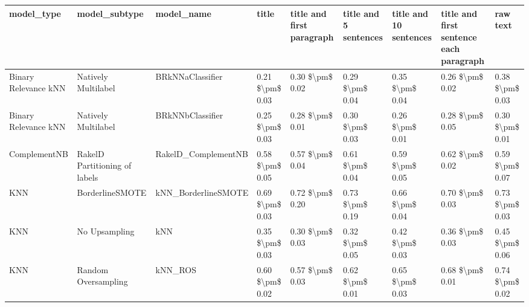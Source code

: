\begin{tabular}{lllllllll}
\toprule
                     model\_type &                 model\_subtype &                                   model\_name &           title & title and first paragraph & title and 5 sentences & title and 10 sentences & title and first sentence each paragraph &        raw text \\
\midrule
           Binary Relevance kNN &           Natively Multilabel &                             BRkNNaClassifier & 0.21 \$\textbackslash pm\$ 0.03 &           0.30 \$\textbackslash pm\$ 0.02 &       0.29 \$\textbackslash pm\$ 0.04 &        0.35 \$\textbackslash pm\$ 0.04 &                         0.26 \$\textbackslash pm\$ 0.02 & 0.38 \$\textbackslash pm\$ 0.03 \\
           Binary Relevance kNN &           Natively Multilabel &                             BRkNNbClassifier & 0.25 \$\textbackslash pm\$ 0.03 &           0.28 \$\textbackslash pm\$ 0.01 &       0.30 \$\textbackslash pm\$ 0.03 &        0.26 \$\textbackslash pm\$ 0.01 &                         0.28 \$\textbackslash pm\$ 0.05 & 0.30 \$\textbackslash pm\$ 0.01 \\
                   ComplementNB & RakelD Partitioning of labels &                          RakelD\_ComplementNB & 0.58 \$\textbackslash pm\$ 0.05 &           0.57 \$\textbackslash pm\$ 0.04 &       0.61 \$\textbackslash pm\$ 0.04 &        0.59 \$\textbackslash pm\$ 0.05 &                         0.62 \$\textbackslash pm\$ 0.02 & 0.59 \$\textbackslash pm\$ 0.07 \\
                            KNN &               BorderlineSMOTE &                          kNN\_BorderlineSMOTE & 0.69 \$\textbackslash pm\$ 0.03 &           0.72 \$\textbackslash pm\$ 0.20 &       0.73 \$\textbackslash pm\$ 0.19 &        0.66 \$\textbackslash pm\$ 0.04 &                         0.70 \$\textbackslash pm\$ 0.03 & 0.73 \$\textbackslash pm\$ 0.03 \\
                            KNN &                 No Upsampling &                                          kNN & 0.35 \$\textbackslash pm\$ 0.03 &           0.30 \$\textbackslash pm\$ 0.03 &       0.32 \$\textbackslash pm\$ 0.05 &        0.42 \$\textbackslash pm\$ 0.03 &                         0.36 \$\textbackslash pm\$ 0.03 & 0.45 \$\textbackslash pm\$ 0.06 \\
                            KNN &           Random Oversampling &                                      kNN\_ROS & 0.60 \$\textbackslash pm\$ 0.02 &           0.57 \$\textbackslash pm\$ 0.03 &       0.62 \$\textbackslash pm\$ 0.01 &        0.65 \$\textbackslash pm\$ 0.03 &                         0.68 \$\textbackslash pm\$ 0.01 & 0.74 \$\textbackslash pm\$ 0.02 \\

\end{tabular}
